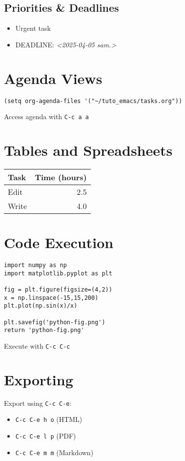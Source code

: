 \documentclass[11pt]{article}
\begin{document}
\subsection{Priorities \& Deadlines}
\label{sec:orgf50cfc5}
\begin{itemize}
\item\relax [\#A] Urgent task
\item DEADLINE: \textit{<2025-04-05 sam.>}
\end{itemize}

\section{Agenda Views}
\label{sec:orgaad47fb}
\begin{verbatim}
(setq org-agenda-files '("~/tuto_emacs/tasks.org"))
\end{verbatim}
Access agenda with \texttt{C-c a a}

\section{Tables and Spreadsheets}
\label{sec:orgc6221d1}
\begin{center}
\begin{tabular}{lr}
Task & Time (hours)\\
\hline
Edit & 2.5\\
Write & 4.0\\
\end{tabular}
\end{center}

\section{Code Execution}
\label{sec:org0377ea1}
\begin{verbatim}
import numpy as np
import matplotlib.pyplot as plt

fig = plt.figure(figsize=(4,2))
x = np.linspace(-15,15,200)
plt.plot(np.sin(x)/x)

plt.savefig('python-fig.png')
return 'python-fig.png'
\end{verbatim}

Execute with \texttt{C-c C-c}

\section{Exporting}
\label{sec:orga332495}
Export using \texttt{C-c C-e}:
\begin{itemize}
\item \texttt{C-c C-e h o} (HTML)
\item \texttt{C-c C-e l p} (PDF)
\item \texttt{C-c C-e m m} (Markdown)
\end{itemize}
\end{document}
